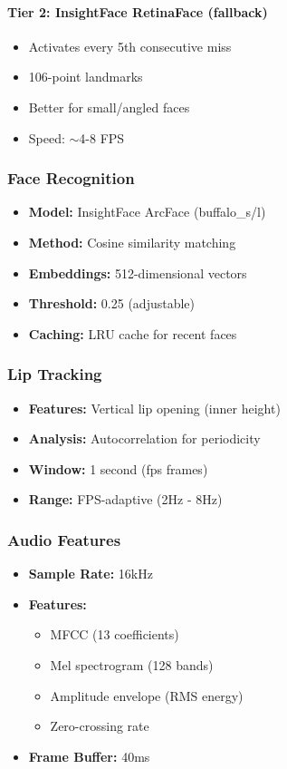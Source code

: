 \documentclass[11pt,a4paper]{article}
\begin{document}
\paragraph{Tier 2: InsightFace RetinaFace (fallback)}
\begin{itemize}
    \item Activates every 5th consecutive miss
    \item 106-point landmarks
    \item Better for small/angled faces
    \item Speed: $\sim$4-8 FPS
\end{itemize}

\subsubsection{Face Recognition}

\begin{itemize}
    \item \textbf{Model:} InsightFace ArcFace (buffalo\_s/l)
    \item \textbf{Method:} Cosine similarity matching
    \item \textbf{Embeddings:} 512-dimensional vectors
    \item \textbf{Threshold:} 0.25 (adjustable)
    \item \textbf{Caching:} LRU cache for recent faces
\end{itemize}

\subsubsection{Lip Tracking}

\begin{itemize}
    \item \textbf{Features:} Vertical lip opening (inner height)
    \item \textbf{Analysis:} Autocorrelation for periodicity
    \item \textbf{Window:} 1 second (fps frames)
    \item \textbf{Range:} FPS-adaptive (2Hz - 8Hz)
\end{itemize}

\subsubsection{Audio Features}

\begin{itemize}
    \item \textbf{Sample Rate:} 16kHz
    \item \textbf{Features:}
    \begin{itemize}
        \item MFCC (13 coefficients)
        \item Mel spectrogram (128 bands)
        \item Amplitude envelope (RMS energy)
        \item Zero-crossing rate
    \end{itemize}
    \item \textbf{Frame Buffer:} 40ms
\end{itemize}
\end{document}
